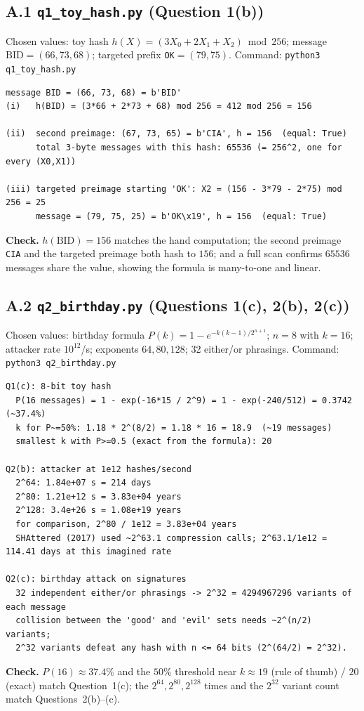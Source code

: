 \documentclass[11pt,a4paper]{article}
\begin{document}
\subsection*{A.1 \texttt{q1\_toy\_hash.py} (Question 1(b))}
Chosen values: toy hash $h(X)=(3X_0+2X_1+X_2)\bmod 256$; message $\mathrm{BID}=(66,73,68)$; targeted
prefix \texttt{OK}$=(79,75)$. Command: \texttt{python3 q1\_toy\_hash.py}
\begin{Verbatim}[fontsize=\footnotesize, frame=single]
message BID = (66, 73, 68) = b'BID'
(i)   h(BID) = (3*66 + 2*73 + 68) mod 256 = 412 mod 256 = 156

(ii)  second preimage: (67, 73, 65) = b'CIA', h = 156  (equal: True)
      total 3-byte messages with this hash: 65536 (= 256^2, one for every (X0,X1))

(iii) targeted preimage starting 'OK': X2 = (156 - 3*79 - 2*75) mod 256 = 25
      message = (79, 75, 25) = b'OK\x19', h = 156  (equal: True)
\end{Verbatim}
\textbf{Check.} $h(\mathrm{BID})=156$ matches the hand computation; the second preimage \texttt{CIA} and
the targeted preimage both hash to $156$; and a full scan confirms $65536$ messages share the value,
showing the formula is many-to-one and linear.

\subsection*{A.2 \texttt{q2\_birthday.py} (Questions 1(c), 2(b), 2(c))}
Chosen values: birthday formula $P(k)=1-e^{-k(k-1)/2^{n+1}}$; $n=8$ with $k=16$; attacker rate
$10^{12}$/s; exponents $64,80,128$; 32 either/or phrasings. Command: \texttt{python3 q2\_birthday.py}
\begin{Verbatim}[fontsize=\footnotesize, frame=single]
Q1(c): 8-bit toy hash
  P(16 messages) = 1 - exp(-16*15 / 2^9) = 1 - exp(-240/512) = 0.3742  (~37.4%)
  k for P~=50%: 1.18 * 2^(8/2) = 1.18 * 16 = 18.9  (~19 messages)
  smallest k with P>=0.5 (exact from the formula): 20

Q2(b): attacker at 1e12 hashes/second
  2^64: 1.84e+07 s = 214 days
  2^80: 1.21e+12 s = 3.83e+04 years
  2^128: 3.4e+26 s = 1.08e+19 years
  for comparison, 2^80 / 1e12 = 3.83e+04 years
  SHAttered (2017) used ~2^63.1 compression calls; 2^63.1/1e12 = 114.41 days at this imagined rate

Q2(c): birthday attack on signatures
  32 independent either/or phrasings -> 2^32 = 4294967296 variants of each message
  collision between the 'good' and 'evil' sets needs ~2^(n/2) variants;
  2^32 variants defeat any hash with n <= 64 bits (2^(64/2) = 2^32).
\end{Verbatim}
\textbf{Check.} $P(16)\approx 37.4\%$ and the $50\%$ threshold near $k\approx 19$ (rule of thumb) / $20$
(exact) match Question~1(c); the $2^{64},2^{80},2^{128}$ times and the $2^{32}$ variant count match
Questions~2(b)--(c).
\end{document}
